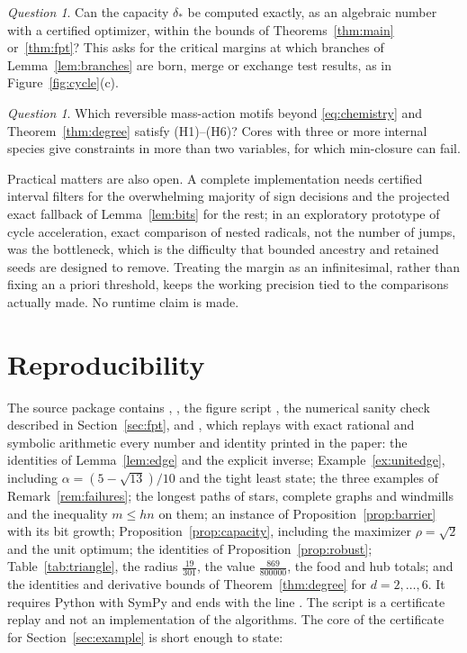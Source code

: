 \documentclass[11pt,a4paper]{article}
\theoremstyle{plain}
\theoremstyle{definition}
\theoremstyle{remark}
\newtheorem{question}[theorem]{Question}
\begin{document}
\begin{question}
Can the capacity $\delta_*$ be computed exactly, as an algebraic number with a certified optimizer, within the bounds of Theorems~\ref{thm:main} or~\ref{thm:fpt}? This asks for the critical margins at which branches of Lemma~\ref{lem:branches} are born, merge or exchange test results, as in Figure~\ref{fig:cycle}(c).
\end{question}

\begin{question}
Which reversible mass-action motifs beyond \eqref{eq:chemistry} and Theorem~\ref{thm:degree} satisfy (H1)--(H6)? Cores with three or more internal species give constraints in more than two variables, for which min-closure can fail.
\end{question}

Practical matters are also open. A complete implementation needs certified interval filters for the overwhelming majority of sign decisions and the projected exact fallback of Lemma~\ref{lem:bits} for the rest; in an exploratory prototype of cycle acceleration, exact comparison of nested radicals, not the number of jumps, was the bottleneck, which is the difficulty that bounded ancestry and retained seeds are designed to remove. Treating the margin as an infinitesimal, rather than fixing an a priori threshold, keeps the working precision tied to the comparisons actually made. No runtime claim is made.

\appendix
\section{Reproducibility}\label{app:repro}

The source package contains , , the figure script , the numerical sanity check  described in Section~\ref{sec:fpt}, and , which replays with exact rational and symbolic arithmetic every number and identity printed in the paper: the identities of Lemma~\ref{lem:edge} and the explicit inverse; Example~\ref{ex:unitedge}, including $\alpha=(5-\sqrt{13})/10$ and the tight least state; the three examples of Remark~\ref{rem:failures}; the longest paths of stars, complete graphs and windmills and the inequality $m\le hn$ on them; an instance of Proposition~\ref{prop:barrier} with its bit growth; Proposition~\ref{prop:capacity}, including the maximizer $\rho=\sqrt2$ and the unit optimum; the identities of Proposition~\ref{prop:robust}; Table~\ref{tab:triangle}, the radius $\tfrac{19}{301}$, the value $\tfrac{869}{800000}$, the food and hub totals; and the identities and derivative bounds of Theorem~\ref{thm:degree} for $d=2,\dots,6$. It requires Python with SymPy and ends with the line . The script is a certificate replay and not an implementation of the algorithms. The core of the certificate for Section~\ref{sec:example} is short enough to state:
\end{document}
